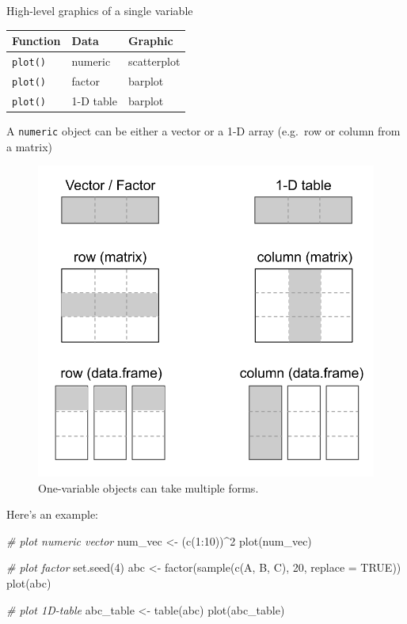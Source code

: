 \documentclass[
]{book}
\newenvironment{Shaded}{\begin{snugshade}}{\end{snugshade}}
\newcommand{\AttributeTok}[1]{\textcolor[rgb]{0.77,0.63,0.00}{#1}}
\newcommand{\CommentTok}[1]{\textcolor[rgb]{0.56,0.35,0.01}{\textit{#1}}}
\newcommand{\ConstantTok}[1]{\textcolor[rgb]{0.00,0.00,0.00}{#1}}
\newcommand{\DecValTok}[1]{\textcolor[rgb]{0.00,0.00,0.81}{#1}}
\newcommand{\FunctionTok}[1]{\textcolor[rgb]{0.00,0.00,0.00}{#1}}
\newcommand{\NormalTok}[1]{#1}
\newcommand{\OtherTok}[1]{\textcolor[rgb]{0.56,0.35,0.01}{#1}}
\newcommand{\SpecialCharTok}[1]{\textcolor[rgb]{0.00,0.00,0.00}{#1}}
\newcommand{\StringTok}[1]{\textcolor[rgb]{0.31,0.60,0.02}{#1}}
\begin{document}
High-level graphics of a single variable

\begin{longtable}[]{@{}lll@{}}
\toprule()
Function & Data & Graphic \\
\midrule()
\endhead
\texttt{plot()} & numeric & scatterplot \\
\texttt{plot()} & factor & barplot \\
\texttt{plot()} & 1-D table & barplot \\
\bottomrule()
\end{longtable}

A \texttt{numeric} object can be either a vector or a 1-D array (e.g.~row or column
from a matrix)

\begin{figure}

{\centering \includegraphics[width=0.5\linewidth]{images/plots/one_variable_objs} 

}

\caption{One-variable objects can take multiple forms.}\label{fig:unnamed-chunk-208}
\end{figure}

Here's an example:

\begin{Shaded}
\begin{Highlighting}[]
\CommentTok{\# plot numeric vector}
\NormalTok{num\_vec }\OtherTok{\textless{}{-}}\NormalTok{ (}\FunctionTok{c}\NormalTok{(}\DecValTok{1}\SpecialCharTok{:}\DecValTok{10}\NormalTok{))}\SpecialCharTok{\^{}}\DecValTok{2}
\FunctionTok{plot}\NormalTok{(num\_vec)}

\CommentTok{\# plot factor}
\FunctionTok{set.seed}\NormalTok{(}\DecValTok{4}\NormalTok{)}
\NormalTok{abc }\OtherTok{\textless{}{-}} \FunctionTok{factor}\NormalTok{(}\FunctionTok{sample}\NormalTok{(}\FunctionTok{c}\NormalTok{(}\StringTok{\textquotesingle{}A\textquotesingle{}}\NormalTok{, }\StringTok{\textquotesingle{}B\textquotesingle{}}\NormalTok{, }\StringTok{\textquotesingle{}C\textquotesingle{}}\NormalTok{), }\DecValTok{20}\NormalTok{, }\AttributeTok{replace =} \ConstantTok{TRUE}\NormalTok{))}
\FunctionTok{plot}\NormalTok{(abc)}

\CommentTok{\# plot 1D{-}table}
\NormalTok{abc\_table }\OtherTok{\textless{}{-}} \FunctionTok{table}\NormalTok{(abc)}
\FunctionTok{plot}\NormalTok{(abc\_table)}
\end{Highlighting}
\end{Shaded}
\end{document}
